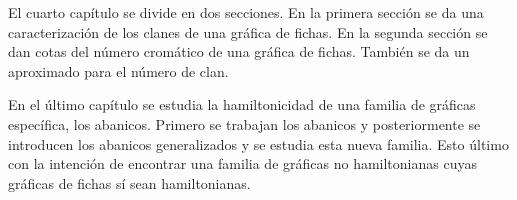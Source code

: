El cuarto cap\'itulo se  divide en dos secciones. En la primera secci\'on se da
una caracterizaci\'on de los clanes de una gr\'afica de fichas. En la segunda
secci\'on se dan cotas del n\'umero crom\'atico de una gr\'afica de fichas.
Tambi\'en se da un aproximado para el n\'umero de clan.

En el \'ultimo cap\'itulo se estudia la hamiltonicidad de una familia de
gr\'aficas espec\'ifica, los abanicos. Primero se trabajan los abanicos y
posteriormente se introducen los abanicos generalizados y se estudia esta nueva
familia. Esto \'ultimo con la intenci\'on de encontrar una familia de gr\'aficas
no hamiltonianas cuyas gr\'aficas de fichas s\'i sean hamiltonianas.